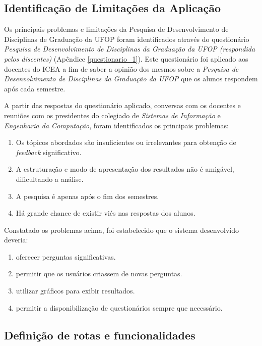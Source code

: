 \documentclass[
  12pt,       %
  openright,      %
  oneside,      %
  a4paper,      %
  english,      %
  french,        %
  spanish,     %
  brazil        %
  ]{abntex2-decsi}
\begin{document}
    \subsection{Identificação de Limitações da Aplicação}

    Os principais problemas e limitações da Pesquisa de Desenvolvimento de Disciplinas de Graduação da UFOP foram identificados através do questionário \textit{Pesquisa de Desenvolvimento de Disciplinas da Graduação da UFOP (respondida pelos discentes)} (Apêndice \ref{questionario_1}). Este questionário foi aplicado aos docentes do ICEA a fim de saber a opinião dos mesmos sobre a \textit{Pesquisa de Desenvolvimento de Disciplinas da Graduação da UFOP} que os alunos respondem após cada semestre. 

    A partir das respostas do questionário aplicado, conversas com os docentes e reuniões com os presidentes do colegiado de \textit{Sistemas de Informação} e \textit{Engenharia da Computação}, foram identificados os principais problemas:

    \begin{enumerate}
    \item Os tópicos abordados são insuficientes ou irrelevantes para obtenção de \textit{feedback} significativo.
    \item A estruturação e modo de apresentação dos resultados não é amigável, dificultando a análise.
    \item A pesquisa é apenas após o fim dos semestres.
    \item Há grande chance de existir viés nas respostas dos alunos.
    \end{enumerate}

    Constatado os problemas acima, foi estabelecido que o sistema desenvolvido deveria: 
    
    \begin{enumerate}
    	\item oferecer perguntas significativas.
        \item permitir que os usuários criassem de novas perguntas.
        \item utilizar gráficos para exibir resultados.
        \item permitir a disponibilização de questionários sempre que necessário.
    \end{enumerate} 

    \subsection{Definição de rotas e funcionalidades}
\end{document}
